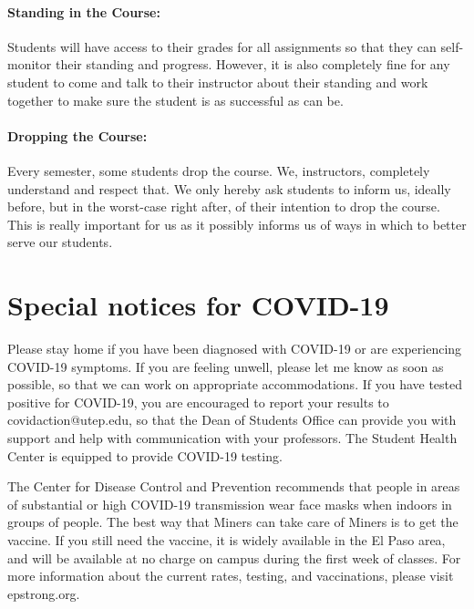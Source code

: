 \documentclass[12pt]{scrartcl}
\begin{document}
\paragraph{Standing in the Course:} 

Students will have access to their grades for all assignments so that they can self-monitor their standing and progress. 
However, it is also completely fine for any student to come and talk to their instructor about their standing and work together to make sure the student is as successful as can be.

\paragraph{Dropping the Course:} 
Every semester, some students drop the course. We, instructors, completely understand and respect that. We only hereby ask students to inform us, ideally before, but in the worst-case right after, of their intention to drop the course. This is really important for us as it possibly informs us of ways in which to better serve our students.


\section{Special notices for COVID-19}

Please stay home if you have been diagnosed with COVID-19 or are experiencing COVID-19 symptoms. 
If you are feeling unwell, please let me know as soon as possible, so that we can work on appropriate accommodations. 
If you have tested positive for COVID-19, 
you are encouraged to report your results to covidaction@utep.edu, 
so that the Dean of Students Office can provide you with support and help with communication with your professors. 
The Student Health Center is equipped to provide COVID-19 testing. 
 
The Center for Disease Control and Prevention recommends that people 
in areas of substantial or high COVID-19 transmission wear face masks when indoors in groups of people. 
The best way that Miners can take care of Miners is to get the vaccine. 
If you still need the vaccine, it is widely available in the El Paso area, 
and will be available at no charge on campus during the first week of classes. 
For more information about the current rates, testing, and vaccinations, please visit epstrong.org.
\end{document}
